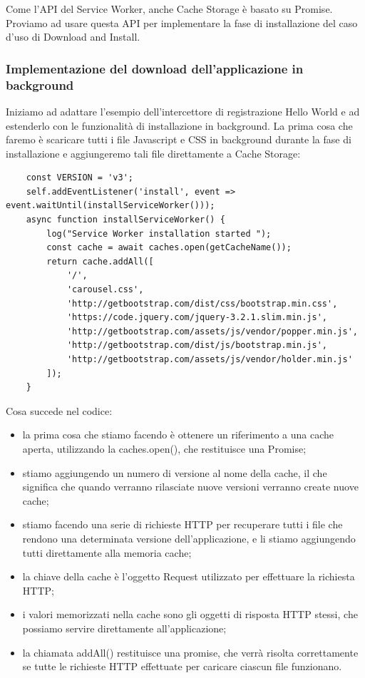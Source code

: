 \documentclass[italian]{article}
\begin{document}
Come l'API del Service Worker, anche Cache Storage è basato su Promise. 
Proviamo ad usare questa API per implementare la fase di installazione del caso d'uso di Download and Install.
\subsubsection{Implementazione del download dell'applicazione in background}
Iniziamo ad adattare l'esempio dell'intercettore di registrazione Hello World e ad estenderlo con le funzionalità di installazione in background.
La prima cosa che faremo è scaricare tutti i file Javascript e CSS in background durante la fase di installazione e aggiungeremo tali file direttamente a Cache Storage:
\pagebreak
\begin{lstlisting}
	const VERSION = 'v3';
	self.addEventListener('install', event => event.waitUntil(installServiceWorker()));
	async function installServiceWorker() {
		log("Service Worker installation started ");
		const cache = await caches.open(getCacheName());
		return cache.addAll([
			'/',
			'carousel.css',
			'http://getbootstrap.com/dist/css/bootstrap.min.css',
			'https://code.jquery.com/jquery-3.2.1.slim.min.js',
			'http://getbootstrap.com/assets/js/vendor/popper.min.js',
			'http://getbootstrap.com/dist/js/bootstrap.min.js',
			'http://getbootstrap.com/assets/js/vendor/holder.min.js'
		]);
	}
\end{lstlisting}
Cosa succede nel codice:
\begin{itemize}
\item la prima cosa che stiamo facendo è ottenere un riferimento a una cache aperta, utilizzando la caches.open(), che restituisce una Promise;
\item stiamo aggiungendo un numero di versione al nome della cache, il che significa che quando verranno rilasciate nuove versioni verranno create nuove cache;
\item stiamo facendo una serie di richieste HTTP per recuperare tutti i file che rendono una determinata versione dell'applicazione, e li stiamo aggiungendo tutti direttamente alla memoria cache;
\item la chiave della cache è l'oggetto Request utilizzato per effettuare la richiesta HTTP;
\item i valori memorizzati nella cache sono gli oggetti di risposta HTTP stessi, che possiamo servire direttamente all'applicazione;
\item la chiamata addAll() restituisce una promise, che verrà risolta correttamente se tutte le richieste HTTP effettuate per caricare ciascun file funzionano.
\end{itemize}
\end{document}
